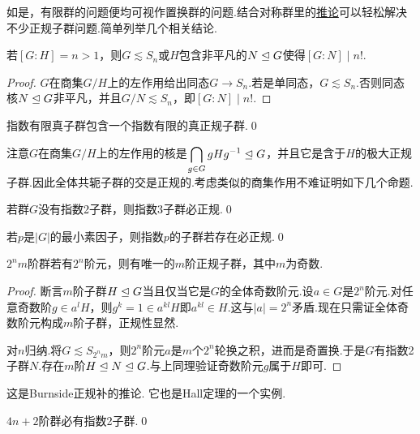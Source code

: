 如是，有限群的问题便均可视作置换群的问题.结合对称群里的\hyperlink{cor:Index2Permutation}{推论}可以轻松解决不少正规子群问题.简单列举几个相关结论.
\begin{prop}
	若$[G:H]=n>1$，则$G\lesssim S_n$\footnotemark 或$H$包含非平凡的$N\trianglelefteq G$使得$[G:N]\mid n!$.
\end{prop}
\begin{proof}
	$G$在商集$G/H$上的左作用给出同态$G\to S_n$.若是单同态，$G\lesssim S_n$.否则同态核$N\trianglelefteq G$非平凡，并且$G/N\lesssim S_n$，即$[G:N]\mid n!$.
\end{proof}
\begin{cor*}
	指数有限真子群包含一个指数有限的真正规子群.\qed
\end{cor*}
\begin{remark}
	注意$G$在商集$G/H$上的左作用的核是$\displaystyle\bigcap_{g\in G}gHg^{-1}\trianglelefteq G$，并且它是含于$H$的极大正规子群.因此全体共轭子群的交是正规的.考虑类似的商集作用不难证明如下几个命题.
\end{remark}
\begin{prop}
	若群$G$没有指数2子群，则指数3子群必正规.\qed
\end{prop}
\begin{prop}
	若$p$是$|G|$的最小素因子，则指数$p$的子群若存在必正规.\qed
\end{prop}
\begin{prop}
	$2^nm$阶群若有$2^n$阶元，则有唯一的$m$阶正规子群，其中$m$为奇数.
\end{prop}
\begin{proof}
	断言$m$阶子群$H\trianglelefteq G$当且仅当它是$G$的全体奇数阶元.设$a\in G$是$2^n$阶元.对任意奇数阶$g\in a^lH$，则$g^k=1\in a^{kl}H$即$a^{kl}\in H$.这与$|a|=2^n$矛盾.现在只需证全体奇数阶元构成$m$阶子群，正规性显然.

	对$n$归纳.将$G\lesssim S_{2^nm}$，则$2^n$阶元$a$是$m$个$2^n$轮换之积，进而是奇置换.于是$G$有指数2子群$N$.存在$m$阶$H\trianglelefteq N\trianglelefteq G$.与上同理验证奇数阶元$g$属于$H$即可.
\end{proof}
\begin{remark}
	这是Burnside正规补的推论.%
	它也是Hall定理的一个实例.%
\end{remark}
\begin{cor*}
	$4n+2$阶群必有指数2子群.\qed
\end{cor*}

